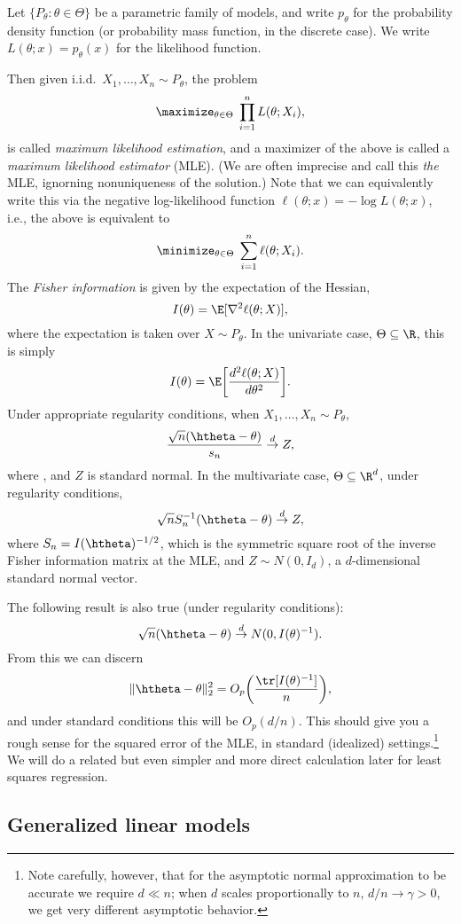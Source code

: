 \documentclass{article}
\begin{document}
Let $\{P_\theta : \theta \in \Theta\}$ be a parametric family of models, and 
write $p_\theta$ for the probability density function (or probability mass
function, in the discrete case). We write $L(\theta; x) = p_\theta(x)$ for the
likelihood function.

Then given i.i.d.\ $X_1,\dots, X_n \sim P_\theta$, the problem
\[ 
\maximize_{\theta \in \Theta} \; \prod_{i=1}^n L(\theta; X_i),
\] 
is called \emph{maximum likelihood estimation}, and a maximizer
\smash{$\htheta$} of the above is called a \emph{maximum likelihood estimator}
(MLE). (We are often imprecise and call this \emph{the} MLE, ignorning
nonuniqueness of the solution.) Note that we can equivalently write this via the 
negative log-likelihood function $\ell(\theta; x) = - \log L(\theta; x)$, i.e., 
the above is equivalent
to  
\[
\minimize_{\theta \in \Theta} \; \sum_{i=1}^n \ell(\theta; X_i).
\]
The \emph{Fisher information} is given by the expectation of the Hessian,
\[
I(\theta) = \E[\nabla^2 \ell(\theta; X) ],
\]
where the expectation is taken over $X \sim P_\theta$. In the univariate case, 
$\Theta \subseteq \R$, this is simply 
\[
I(\theta) = \E\bigg[ \frac{d^2 \ell(\theta; X)}{d\theta^2} \bigg].
\]
Under appropriate regularity conditions, when $X_1,\dots,X_n \sim P_\theta$, 
\[
\frac{\sqrt{n}(\htheta - \theta)}{s_n} \dto Z, 
\]
where , and $Z$ is standard normal. In the 
multivariate case, $\Theta \subseteq \R^d$, under regularity conditions, 
\[
\sqrt{n} S_n^{-1} (\htheta - \theta) \dto Z,
\]
where $S_n = I(\htheta)^{-1/2}$, which is the symmetric square root of the
inverse Fisher information matrix at the MLE, and $Z \sim N(0, I_d)$, a
$d$-dimensional standard normal vector.    

The following result is also true (under regularity conditions):
\[
\sqrt{n} (\htheta - \theta) \dto N(0, I(\theta) ^{-1}).
\]
From this we can discern
\[
\|\htheta - \theta\|_2^2 = O_p \bigg( \frac{\tr[I(\theta) ^{-1}]}{n} \bigg),    
\] 
and under standard conditions this will be $O_p(d/n)$. This should give you a
rough sense for the squared error of the MLE, in standard (idealized)
settings.\footnote{ Note carefully, however, that for the asymptotic normal
  approximation to be accurate we require $d \ll n$; when $d$ scales
  proportionally to $n$, $d/n \to \gamma > 0$, we get very different asymptotic
  behavior.} 
We will do a related but even simpler and more direct calculation later for
least squares regression. 

\subsection{Generalized linear models}
\end{document}
